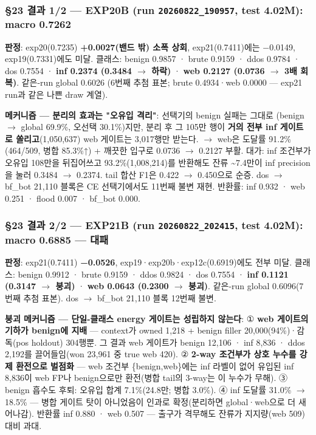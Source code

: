 \subsubsection{§23 결과 1/\allowbreak{}2 — EXP20B (run \texttt{20260822\allowbreak{}\_\allowbreak{}\allowbreak{}190957}, test 4.02M): macro \textbf{0.7262}}
\textbf{판정}: exp20(0.7235) \textbf{+\allowbreak{}0.0027(밴드 밖) 소폭 상회}, exp21(0.7411)에는 −0.0149, exp19(0.7331)에도 미달. 클래스: benign 0.9857 · brute 0.9159 · ddos 0.9784 · dos 0.7554 · \textbf{inf 0.2374 (0.3484 \ensuremath{\rightarrow} 하락)} · \textbf{web 0.2127 (0.0736 \ensuremath{\rightarrow} 3배 회복)}. 같은-run global 0.6026 (6번째 추첨 표본; brute 0.4934·web 0.0000 — exp21 run과 같은 나쁜 draw 계열).

\textbf{메커니즘 — 분리의 효과는 "오유입 격리"}: 선택기의 benign 실패는 그대로 (benign \ensuremath{\rightarrow} global 69.9\%, 오선택 30.1\%)지만, 분리 후 그 105만 행이 \textbf{거의 전부 inf 게이트로 쏠리고}(1,050,637) web 게이트는 3,017행만 받는다.  \ensuremath{\rightarrow}  web은 도달률 91.2\%(464/\allowbreak{}509, 병합 85.3\%↑) +\allowbreak{} 깨끗한 입구로 0.0736 \ensuremath{\rightarrow} 0.2127 부활. 대가: inf 조건부가 오유입 108만을 뒤집어쓰고 93.2\%(1,008,214)를 반환해도 잔류 \textasciitilde{}7.4만이 inf precision을 눌러 0.3484 \ensuremath{\rightarrow} 0.2374. tail 합산 F1은 0.422 \ensuremath{\rightarrow} 0.450으로 순증. dos \ensuremath{\rightarrow} bf\_\allowbreak{}bot 21,110 블록은 CE 선택기에서도 11번째 불변 재현. 반환률: inf 0.932 · web 0.251 · flood 0.007 · bf\_\allowbreak{}bot 0.000.

\subsubsection{§23 결과 2/\allowbreak{}2 — EXP21B (run \texttt{20260822\allowbreak{}\_\allowbreak{}\allowbreak{}202415}, test 4.02M): macro \textbf{0.6885 — 대패}}
\textbf{판정}: exp21(0.7411) \textbf{−0.0526}, exp19·exp20b·exp12c(0.6919)에도 전부 미달. 클래스: benign 0.9912 · brute 0.9159 · ddos 0.9824 · dos 0.7554 · \textbf{inf 0.1121 (0.3147 \ensuremath{\rightarrow} 붕괴)} · \textbf{web 0.0643 (0.2300 \ensuremath{\rightarrow} 붕괴)}. 같은-run global 0.6096(7번째 추첨 표본). dos \ensuremath{\rightarrow} bf\_\allowbreak{}bot 21,110 블록 12번째 불변.

\textbf{붕괴 메커니즘 — 단일-클래스 energy 게이트는 성립하지 않는다}: ① \textbf{web 게이트의 기하가 benign에 지배} — context가 owned 1,218 +\allowbreak{} benign filler 20,000(94\%)·감독(pos holdout) 304행뿐. 그 결과 web 게이트가 benign 12,106 · inf 8,836 · ddos 2,192를 끌어들임(won 23,961 중 true web 420). ② \textbf{2-way 조건부가 상호 누수를 강제 환전으로 벌점화} — web 조건부 \{benign,web\}에는 inf 라벨이 없어 유입된 inf 8,836이 web FP나 benign으로만 환전(병합 tail의 3-way는 이 누수가 무해). ③ benign 흡수도 후퇴: 오유입 합계 7.1\%(24.8만; 병합 3.0\%). ④ inf 도달률 31.0\% \ensuremath{\rightarrow} 18.5\% — 병합 게이트 탓이 아니었음이 인과로 확정(분리하면 global·web으로 더 새어나감). 반환률 inf 0.880 · web 0.507 — 출구가 격무해도 잔류가 지지량(web 509) 대비 과대.

